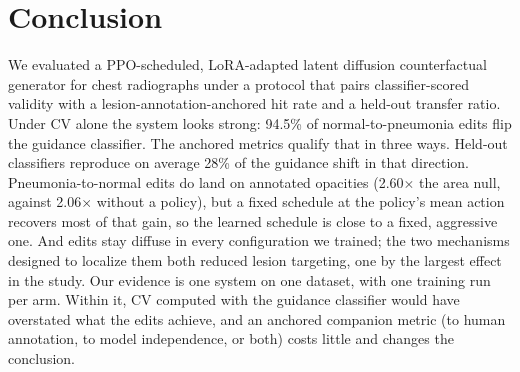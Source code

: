 \section{Conclusion}
\label{sec:conclusion}

We evaluated a PPO-scheduled, LoRA-adapted latent diffusion counterfactual generator for chest radiographs under a protocol that pairs classifier-scored validity with a lesion-annotation-anchored hit rate and a held-out transfer ratio. Under CV alone the system looks strong: 94.5\% of normal-to-pneumonia edits flip the guidance classifier. The anchored metrics qualify that in three ways. Held-out classifiers reproduce on average 28\% of the guidance shift in that direction. Pneumonia-to-normal edits do land on annotated opacities (2.60$\times$ the area null, against 2.06$\times$ without a policy), but a fixed schedule at the policy's mean action recovers most of that gain, so the learned schedule is close to a fixed, aggressive one. And edits stay diffuse in every configuration we trained; the two mechanisms designed to localize them both reduced lesion targeting, one by the largest effect in the study. Our evidence is one system on one dataset, with one training run per arm. Within it, CV computed with the guidance classifier would have overstated what the edits achieve, and an anchored companion metric (to human annotation, to model independence, or both) costs little and changes the conclusion.
